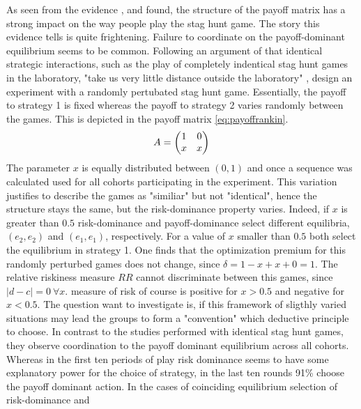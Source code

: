 \documentclass[11pt]{article}
\begin{document}
As seen from the evidence \textcite{battalio_optimization_2001},
\textcite{schmidt_playing_2003} and \textcite{dubois_optimization_2012} 
found, the structure of the payoff matrix has a strong impact on the way 
people play the stag hunt game.   
The story this evidence tells is quite frightening. Failure to coordinate 
on the payoff-dominant equilibrium seems to be common. 
Following an argument of \textcite{kreps_game_1990} that identical strategic 
interactions, such as the play of completely indentical stag hunt games 
in the laboratory, "take us very little distance outside the laboratory" 
\parencite[212]{kreps_game_1990}, 
\textcite{rankin_strategic_2000} design an experiment with a randomly 
pertubated stag hunt game. Essentially, the payoff to strategy 1 is fixed 
whereas the payoff to strategy 2 varies randomly between the games. This is
depicted in the payoff matrix \eqref{eq:payoffrankin}.
\begin{align}
        \label{eq:payoffrankin}
        A = \mqty(1 & 0 \\ x & x)
\end{align}        
The parameter $x$ is equally distributed between $(0,1)$ and once a sequence
was calculated used for all cohorts participating in the experiment. This
variation justifies to describe the games as "similiar" but not
"identical", hence the structure stays the same, but the risk-dominance 
property varies. Indeed, if $x$ is greater than $0.5$ risk-dominance and
payoff-dominance select different equilibria, $(e_2,e_2)$ and $(e_1,e_1)$,
respectively. For a value of $x$ smaller than $0.5$ both select 
the equilibrium in strategy 1. One finds that the optimization premium for 
this randomly perturbed games does not change, since $\delta=1-x+x+0=1$. 
The relative riskiness measure $RR$ cannot discriminate between this games,
since $|d-c|=0\ \forall x$. \textcite{schmidt_playing_2003} measure of risk of 
course is positive for $x > 0.5$ and negative for $x <0.5$. 
The question \textcite{rankin_strategic_2000}
want to investigate is, if this framework of sligthly varied situations may
lead the groups to form a "convention" which deductive principle to choose. 
In contrast to the studies performed with identical stag hunt games, they 
observe coordination to the payoff dominant equilibrium across
all cohorts. Whereas in the first ten periods of play risk dominance seems
to have some explanatory power for the choice of strategy, in the last ten
rounds 91\% choose the payoff dominant action. 
In the cases of coinciding equilibrium selection of risk-dominance and 
\end{document}
